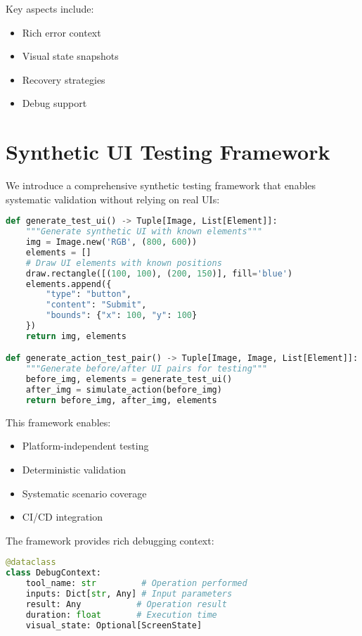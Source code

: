 \documentclass{article}
\begin{document}
Key aspects include:
\begin{itemize}
    \item Rich error context
    \item Visual state snapshots
    \item Recovery strategies
    \item Debug support
\end{itemize}

\section{Synthetic UI Testing Framework}
We introduce a comprehensive synthetic testing framework that enables systematic validation without relying on real UIs:

\begin{lstlisting}[language=Python]
def generate_test_ui() -> Tuple[Image, List[Element]]:
    """Generate synthetic UI with known elements"""
    img = Image.new('RGB', (800, 600))
    elements = []
    # Draw UI elements with known positions
    draw.rectangle([(100, 100), (200, 150)], fill='blue')
    elements.append({
        "type": "button",
        "content": "Submit",
        "bounds": {"x": 100, "y": 100}
    })
    return img, elements

def generate_action_test_pair() -> Tuple[Image, Image, List[Element]]:
    """Generate before/after UI pairs for testing"""
    before_img, elements = generate_test_ui()
    after_img = simulate_action(before_img)
    return before_img, after_img, elements
\end{lstlisting}

This framework enables:
\begin{itemize}
    \item Platform-independent testing
    \item Deterministic validation
    \item Systematic scenario coverage
    \item CI/CD integration
\end{itemize}

The framework provides rich debugging context:

\begin{lstlisting}[language=Python]
@dataclass
class DebugContext:
    tool_name: str         # Operation performed
    inputs: Dict[str, Any] # Input parameters
    result: Any           # Operation result
    duration: float       # Execution time
    visual_state: Optional[ScreenState]
\end{lstlisting}
\end{document}
